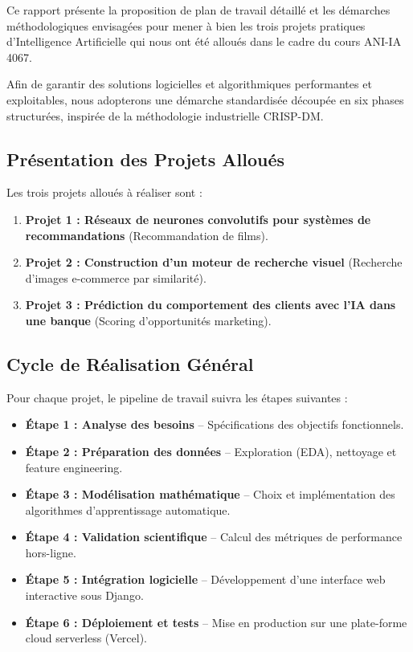 \documentclass[12pt,a4paper]{article}
\begin{document}
Ce rapport présente la proposition de plan de travail détaillé et les démarches méthodologiques envisagées pour mener à bien les trois projets pratiques d'Intelligence Artificielle qui nous ont été alloués dans le cadre du cours ANI-IA 4067. 

Afin de garantir des solutions logicielles et algorithmiques performantes et exploitables, nous adopterons une démarche standardisée découpée en six phases structurées, inspirée de la méthodologie industrielle CRISP-DM.

\subsection{Présentation des Projets Alloués}
Les trois projets alloués à réaliser sont :
\begin{enumerate}
    \item \textbf{Projet 1 : Réseaux de neurones convolutifs pour systèmes de recommandations} (Recommandation de films).
    \item \textbf{Projet 2 : Construction d’un moteur de recherche visuel} (Recherche d'images e-commerce par similarité).
    \item \textbf{Projet 3 : Prédiction du comportement des clients avec l'IA dans une banque} (Scoring d'opportunités marketing).
\end{enumerate}

\subsection{Cycle de Réalisation Général}
Pour chaque projet, le pipeline de travail suivra les étapes suivantes :
\begin{itemize}
    \item \textbf{Étape 1 : Analyse des besoins} -- Spécifications des objectifs fonctionnels.
    \item \textbf{Étape 2 : Préparation des données} -- Exploration (EDA), nettoyage et feature engineering.
    \item \textbf{Étape 3 : Modélisation mathématique} -- Choix et implémentation des algorithmes d'apprentissage automatique.
    \item \textbf{Étape 4 : Validation scientifique} -- Calcul des métriques de performance hors-ligne.
    \item \textbf{Étape 5 : Intégration logicielle} -- Développement d'une interface web interactive sous Django.
    \item \textbf{Étape 6 : Déploiement et tests} -- Mise en production sur une plate-forme cloud serverless (Vercel).
\end{itemize}
\end{document}
